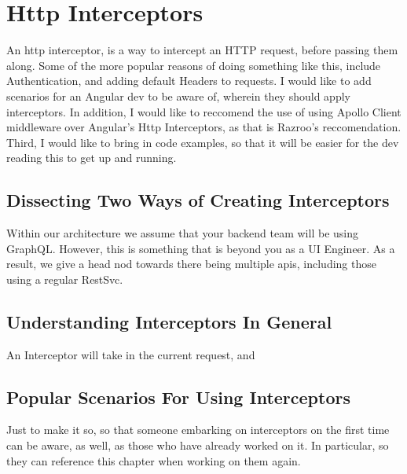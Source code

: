 \section{ Http Interceptors }
\maketitle{}

An http interceptor, is a way to intercept an HTTP request, before passing them
along. Some of the more popular reasons of doing something like this, include 
Authentication, and adding default Headers to requests. I would like to add 
scenarios for an Angular dev to be aware of, wherein they should apply 
interceptors. In addition, I would like to reccomend the use of using Apollo 
Client middleware over Angular's Http Interceptors, as that is Razroo's 
reccomendation. Third, I would like to bring in code examples, so that it will
be easier for the dev reading this to get up and running.

\subsection{Dissecting Two Ways of Creating Interceptors}
Within our architecture we assume that your backend team will be using GraphQL. 
However, this is something that is beyond you as a UI Engineer. As a result,
we give a head nod towards there being multiple apis, including those using a 
regular RestSvc. 

\subsection{ Understanding Interceptors In General}
An Interceptor will take in the current request, and 

\subsection{ Popular Scenarios For Using Interceptors }
Just to make it so, so that someone embarking on interceptors on the first 
time can be aware, as well, as those who have already worked on it. In
particular, so they can reference this chapter when working on them again. 

